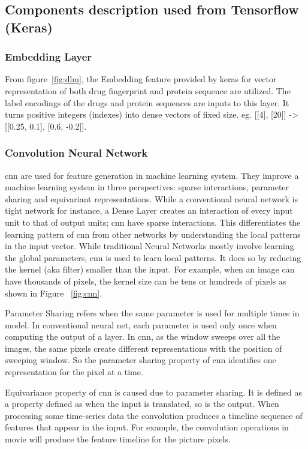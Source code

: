  \subsection{Components description used from Tensorflow (Keras)}
  \subsubsection{Embedding Layer}
  From figure~\ref{fig:dlm}, the Embedding feature provided by keras for vector representation of both drug fingerprint and protein sequence are utilized. The label encodings of the drugs and protein sequences are inputs to this layer. It turns positive integers (indexes) into dense vectors of fixed size. eg. [[4], [20]] -> [[0.25, 0.1], [0.6, -0.2]].

  \subsubsection{Convolution Neural Network}
  \acrfull{cnn} are used for feature generation in machine learning system. They improve a machine learning system in three perspectives: sparse interactions, parameter sharing and equivariant representations. While a conventional neural network is tight network for instance, a Dense Layer creates an interaction of every input unit to that of output units; \acrshort{cnn} have sparse interactions. This differentiates the learning pattern of \acrshort{cnn} from other networks by understanding the local patterns in the input vector. While traditional Neural Networks mostly involve learning the global parameters, \acrshort{cnn} is used to learn local patterns. It does so by reducing the kernel (aka filter) smaller than the input. For example, when an image can have thousands of pixels, the kernel size can be tens or hundreds of pixels as shown in Figure ~\ref{fig:cnn}. 
  
  Parameter Sharing refers when the same parameter is used for multiple times in model. In conventional neural net, each parameter is used only once when computing the output of a layer. In \acrshort{cnn}, as the window sweeps over all the images, the same pixels create different representations with the position of sweeping window. So the parameter sharing property of \acrshort{cnn} identifies one representation for the pixel at a time.
  
  Equivariance property of \acrshort{cnn} is caused due to parameter sharing. It is defined as a property defined as when the input is translated, so is the output. When processing some time-series data the convolution produces a timeline sequence of features that appear in the input. For example, the convolution operations in movie will produce the feature timeline for the picture pixels.

